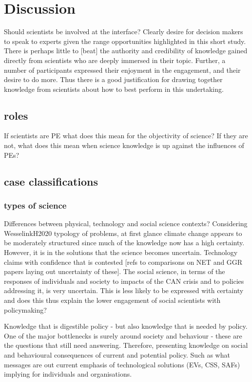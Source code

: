 \chapter{Discussion}\label{ch:discussion}

Should scientists be involved at the interface?
Clearly desire for decision makers to speak to experts given the range opportunities highlighted in this short study. There is perhaps little to [beat] the  authority and credibility of knowledge gained directly from scientists who are deeply immersed in their topic. Further, a number of participants expressed their enjoyment in the engagement, and their desire to do more. Thus there is a good justification for drawing together knowledge from scientists about how to best perform in this undertaking.

\section{roles}
If scientists are PE what does this mean for the objectivity of science?
If they are not, what does this mean when science knowledge is up against the influences of PEs?

\section{case classifications}
\subsection{types of science}
Differences between physical, technology and social science contexts?
Considering WesselinkH2020 typology of problems, at first glance climate change appears to be moderately structured since much of the knowledge now has a high certainty. However, it is in the solutions that the science becomes uncertain. Technology claims with confidence that is contested [refs to comparisons on NET and GGR papers laying out uncertainty of these]. The social science, in terms of the responses of individuals and society to impacts of the CAN crisis and to policies addressing it, is very uncertain. This is less likely to be expressed with certainty and does this thus explain the lower engagement of social scientists with policymaking?

Knowledge that is digestible policy - but also knowledge that is needed by policy. One of the major bottlenecks is surely around society and behaviour - these are the questions that still need answering. Therefore, presenting knowledge on social and behavioural consequences of current and potential policy. Such as what messages are out current emphasis of technological solutions (EVs, CSS, SAFs) implying for individuals and organisations.

